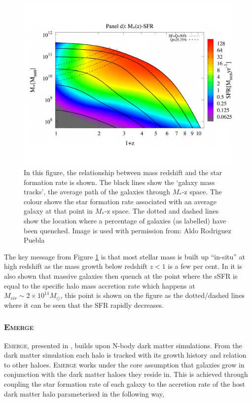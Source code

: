 \begin{figure}[h]
    \centering
    \includegraphics[width = \linewidth]{Figures/Chapter1/RP17_fig9.pdf}
    \caption{In this figure, the relationship between mass redshift and the star formation rate is shown. The black lines show the `galaxy mass tracks', the average path of the galaxies through $M_*$-z space. The colour shows the star formation rate associated with an average galaxy at that point in $M_*$-z space. The dotted and dashed lines show the location where a percentage of galaxies (as labelled) have been quenched.
    Image is used with permission from: Aldo Rodriguez Puebla \cite{Rodriguez-Puebla2017ConstrainingProperties}}
    \label{fig:RP_fig}
\end{figure}


The key message from Figure \ref{fig:RP_fig} is that most stellar mass is built up ``in-situ'' at high redshift as the mass growth below redshift $z<1$ is a few per cent. In \citet{Rodriguez-Puebla2017ConstrainingProperties} it is also shown that massive galaxies then quench at the point where the sSFR is equal to the specific halo mass accretion rate which happens at $M_{vir} \sim 2 \times 10^{11} M_{\odot}$, this point is shown on the figure as the dotted/dashed lines where it can be seen that the SFR rapidly decreases.


\subsubsection{E\textsc{merge}}
E\textsc{merge}, presented in \citet{Moster2018Emerge10}, builds upon N-body dark matter simulations. From the dark matter simulation each halo is tracked with its growth history and relation to other haloes. E\textsc{merge} works under the core assumption that galaxies grow in conjunction with the dark matter haloes they reside in. This is achieved through coupling the star formation rate of each galaxy to the accretion rate of the host dark matter halo parameterised in the following way,

